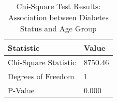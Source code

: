 
\begin{table}[h!]
\centering
\begin{tabular}{|l|l|}
\hline
\textbf{Statistic}       & \textbf{Value} \\ \hline
Chi-Square Statistic        & 8750.46       \\ \hline
Degrees of Freedom          & 1          \\ \hline
P-Value                     & 0.000         \\ \hline
\end{tabular}

\vspace{0.5cm} %

\caption{Chi-Square Test Results: Association between Diabetes Status and Age Group}
\label{tab:high_cholresterol_age_group_results}
\end{table}
